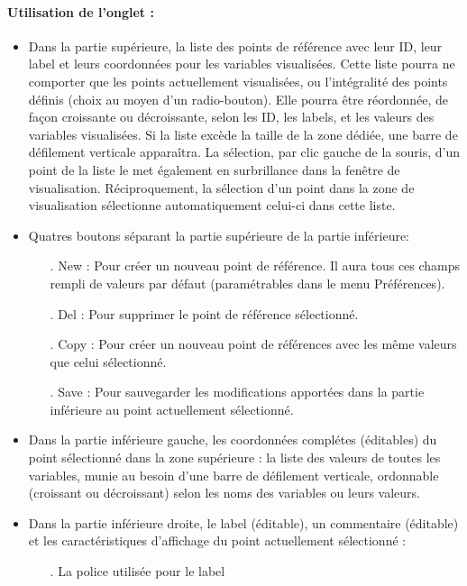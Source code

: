 \documentclass[a4paper]{article}
\begin{document}
\paragraph{Utilisation de l'onglet :}

\begin{itemize}
\item Dans la partie supérieure, la liste des points de référence avec leur ID, leur label et leurs coordonnées pour les variables visualisées. Cette liste pourra ne comporter que les points actuellement visualisées, ou l'intégralité des points définis (choix au moyen d'un radio-bouton\danger). Elle pourra être réordonnée, de façon croissante ou décroissante, selon les ID, les labels, et les valeurs des variables visualisées. Si la liste excède la taille de la zone dédiée, une barre de défilement verticale apparaîtra. La sélection, par clic gauche de la souris, d'un point de la liste le met également en surbrillance dans la fenêtre de visualisation. Réciproquement, la sélection d'un point dans la zone de visualisation sélectionne automatiquement celui-ci dans cette liste.
\item Quatres boutons séparant la partie supérieure de la partie inférieure:
  \begin{itemize}
  \item[.] New : Pour créer un nouveau point de référence. Il aura tous ces champs rempli de valeurs par défaut (paramétrables dans le menu Préférences).
  \item[.] Del : Pour supprimer le point de référence sélectionné.
  \item[.] Copy : Pour créer un nouveau point de références avec les même valeurs que celui sélectionné.
  \item[.] Save : Pour sauvegarder les modifications apportées dans la partie inférieure au point actuellement sélectionné.
  \end{itemize}
\item Dans la partie inférieure gauche, les coordonnées complétes (éditables) du point sélectionné dans la zone supérieure : la liste des valeurs de toutes les variables, munie au besoin d'une barre de défilement verticale, ordonnable (croissant ou décroissant) selon les noms des variables ou leurs valeurs.
\item Dans la partie inférieure droite, le label (éditable), un commentaire (éditable) et les caractéristiques d'affichage du point actuellement sélectionné :
  \begin{itemize}
  \item[.] La police utilisée pour le label

\end{itemize}
\end{itemize}
\end{document}
